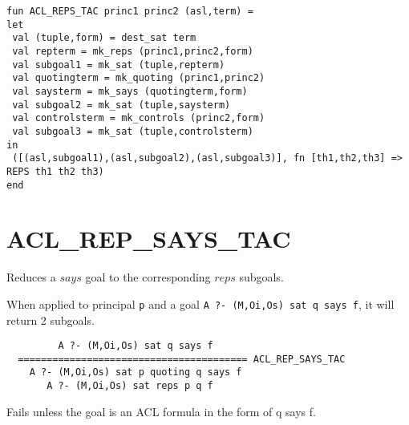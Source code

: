 \IMPLEMENTATION
\begin{holboxed}
\begin{verbatim}
fun ACL_REPS_TAC princ1 princ2 (asl,term) =
let
 val (tuple,form) = dest_sat term
 val repterm = mk_reps (princ1,princ2,form)
 val subgoal1 = mk_sat (tuple,repterm)
 val quotingterm = mk_quoting (princ1,princ2)
 val saysterm = mk_says (quotingterm,form)
 val subgoal2 = mk_sat (tuple,saysterm)
 val controlsterm = mk_controls (princ2,form)
 val subgoal3 = mk_sat (tuple,controlsterm)
in
 ([(asl,subgoal1),(asl,subgoal2),(asl,subgoal3)], fn [th1,th2,th3] => REPS th1 th2 th3)
end
\end{verbatim}
\end{holboxed}

\SEEALSO
\ENDDOC

\section{ACL\_REP\_SAYS\_TAC}



\egroup


\SYNOPSIS
Reduces a $says$ goal to the corresponding $reps$ subgoals.

\DESCRIBE When applied to principal \texttt{p} and a goal \texttt{A ?- (M,Oi,Os) sat q says f}, it will return 2 subgoals.
\begin{verbatim}
         A ?- (M,Oi,Os) sat q says f
  ======================================== ACL_REP_SAYS_TAC
    A ?- (M,Oi,Os) sat p quoting q says f
       A ?- (M,Oi,Os) sat reps p q f
\end{verbatim}

\FAILURE 
Fails unless the goal is an ACL formula in the form of q says f.


